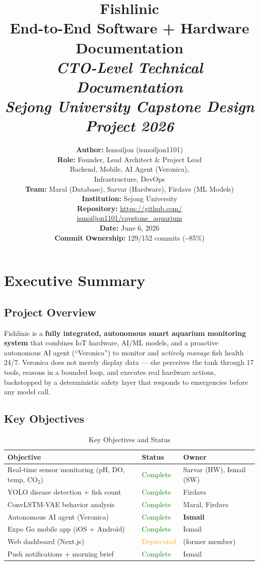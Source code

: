 \documentclass[12pt,a4paper,oneside]{article}
\title{
    \vspace{2cm}
    \Huge\textbf{Fishlinic}\\
    \Large\textbf{End-to-End Software + Hardware Documentation}\\
    \vspace{1cm}
    \large\textit{CTO-Level Technical Documentation}\\
    \large\textit{Sejong University Capstone Design Project 2026}
    \vspace{2cm}
}
\author{
    \textbf{Author:} Ismoiljon (ismoiljon1101)\\
    \textbf{Role:} Founder, Lead Architect \& Project Lead\\
    \hspace*{1.5em}Backend, Mobile, AI Agent (Veronica),\\
    \hspace*{1.5em}Infrastructure, DevOps\\
    \textbf{Team:} Maral (Database), Sarvar (Hardware), Firdavs (ML Models)\\
    \textbf{Institution:} Sejong University\\
    \textbf{Repository:} \url{https://github.com/} \\
    \url{ismoiljon1101/capstone_aquarium}\\
    \textbf{Date:} June 6, 2026\\
    \textbf{Commit Ownership:} 129/152 commits (\textasciitilde85\%)
}
\date{}
\begin{document}
\maketitle
\thispagestyle{empty}

\newpage
\tableofcontents

\newpage
\section{Executive Summary}

\subsection{Project Overview}
Fishlinic is a \textbf{fully integrated, autonomous smart aquarium monitoring system} that combines IoT hardware, AI/ML models, and a proactive autonomous AI agent (``Veronica'') to monitor and \emph{actively manage} fish health 24/7. Veronica does not merely display data --- she perceives the tank through 17 tools, reasons in a bounded loop, and executes real hardware actions, backstopped by a deterministic safety layer that responds to emergencies before any model call.

\subsection{Key Objectives}
\begin{table}[H]
    \centering\small
    \begin{tabularx}{\textwidth}{Xll}
        \toprule
        \textbf{Objective} & \textbf{Status} & \textbf{Owner} \\
        \midrule
        Real-time sensor monitoring (pH, DO, temp, CO$_2$) & \textcolor{green}{Complete} & Sarvar (HW), Ismail (SW) \\
        YOLO disease detection + fish count & \textcolor{green}{Complete} & Firdavs \\
        ConvLSTM-VAE behavior analysis & \textcolor{green}{Complete} & Maral, Firdavs \\
        Autonomous AI agent (Veronica) & \textcolor{green}{Complete} & \textbf{Ismail} \\
        Expo Go mobile app (iOS + Android) & \textcolor{green}{Complete} & Ismail \\
        Web dashboard (Next.js) & \textcolor{orange}{Deprecated} & (former member) \\
        Push notifications + morning brief & \textcolor{green}{Complete} & Ismail \\
        \bottomrule
    \end{tabularx}
    \caption{Key Objectives and Status}
\end{table}
\end{document}
